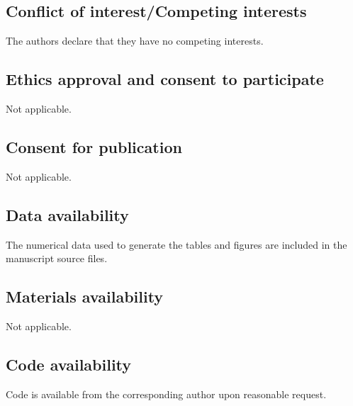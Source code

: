\documentclass[pdflatex,sn-mathphys-num]{sn-jnl}
\theoremstyle{thmstyleone}%
\theoremstyle{thmstylethree}%
\theoremstyle{thmstyletwo}%
\begin{document}
\subsection*{Conflict of interest/Competing interests}
The authors declare that they have no competing interests.

\subsection*{Ethics approval and consent to participate}
Not applicable.

\subsection*{Consent for publication}
Not applicable.

\subsection*{Data availability}
The numerical data used to generate the tables and figures are included in the manuscript source files.

\subsection*{Materials availability}
Not applicable.

\subsection*{Code availability}
Code is available from the corresponding author upon reasonable request.
\end{document}
